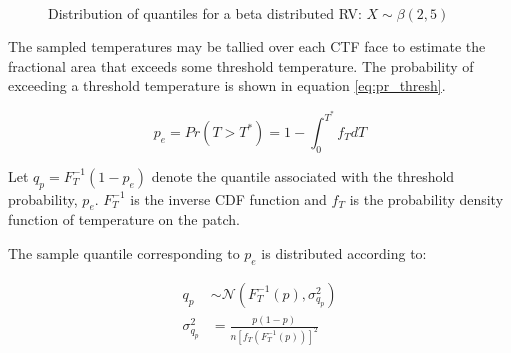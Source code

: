 \begin{figure}[H]%
     \captionsetup[subfigure]{justification=centering}
    \centering
    \hspace*{-1.0em}%
    \hspace*{-1.0em}%
    \\
    \hspace*{-1.0em}%
    \qquad
    \caption[Distribution of quantiles for a beta distributed RV.]{Distribution of quantiles for a beta distributed RV: $X \sim \beta(2, 5)$}%
    \label{fig:beta_g_theory}%
\end{figure}

The sampled temperatures may be tallied over each CTF face to estimate the fractional area that exceeds some threshold temperature.  The probability of exceeding a threshold temperature is shown in equation \ref{eq:pr_thresh}.

    \begin{equation}
    p_e = Pr(T > T^*) = 1 - \int_0^{T^*} f_T dT
    \label{eq:pr_thresh}
    \end{equation}

    Let $q_p = F_T^{-1}(1 - p_e)$
    denote the quantile associated with the threshold probability, $p_e$.
    $F_T^{-1}$ is the inverse CDF function and $f_T$ is the probability density function of temperature on the patch.

    The sample quantile corresponding to $p_e$ is distributed according to:

   \begin{eqnarray}
    q_p &\sim \mathcal N \left( F_T^{-1}(p), \sigma^2_{q_p} \right) \\
    \sigma^2_{q_p} &= \frac{p(1 - p)}{n[f_T(F_T^{-1}(p))]^2}
    \end{eqnarray}

